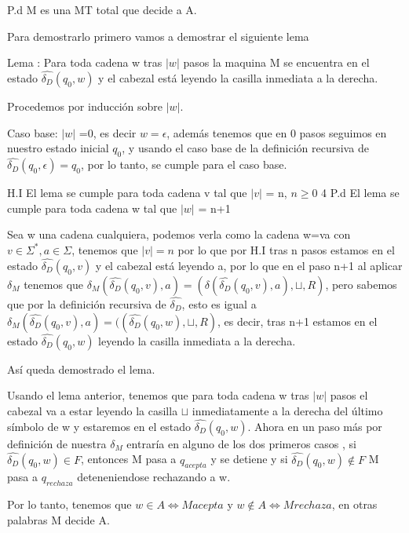 \documentclass{article}
\begin{document}
\begin{enumerate}
  P.d M es una MT total que decide a A.

  Para demostrarlo primero vamos a demostrar el siguiente lema

  Lema : Para toda cadena w tras $|w|$ pasos la maquina M se encuentra en el estado $\widehat{\delta_D}(q_0,w)$ y el cabezal está leyendo la casilla inmediata a la derecha.

  Procedemos por inducción sobre $|w|$.

  Caso base: $|w|$ =0, es decir $w=\epsilon$, además tenemos que en 0 pasos seguimos en nuestro estado inicial $q_0$, y usando el caso base de la definición recursiva de $\widehat{\delta_D}(q_0,\epsilon)=q_0$, por lo tanto, se cumple para el caso base.

  H.I El lema se cumple para toda cadena v tal que $|v|$ = n, $n \geq 0$
4
  P.d El lema se cumple para toda cadena w tal que $|w|$ = n+1

  Sea w una cadena cualquiera, podemos verla como la cadena w=va con $v \in \Sigma^*, a \in \Sigma$, tenemos que $|v| = n$ por lo que por H.I tras n pasos estamos en el estado $\widehat{\delta_D}(q_0,v)$ y el cabezal está leyendo a, por lo que en el paso n+1 al aplicar $\delta_M$ tenemos que $\delta_M(\widehat{\delta_D}(q_0,v),a)= (\delta(\widehat{\delta_D}(q_0,v),a),\sqcup,R)$, pero sabemos que por la definición recursiva de $\widehat{\delta_D}$, esto es igual a $\delta_M(\widehat{\delta_D}(q_0,v),a)= ((\widehat{\delta_D}(q_0,w),\sqcup,R)$, es decir, tras n+1 estamos en el estado $\widehat{\delta_D}(q_0,w)$ leyendo la casilla inmediata a la derecha.

  Así queda demostrado el lema.


  Usando el lema anterior, tenemos que para toda cadena w tras $|w|$ pasos el cabezal va a estar leyendo la casilla $\sqcup$ inmediatamente a la derecha del último símbolo de w y estaremos en el estado $\widehat{\delta_D}(q_0,w)$. Ahora en un paso más por definición de nuestra $\delta_M$ entraría en alguno de los dos primeros casos , si $\widehat{\delta_D}(q_0,w) \in F$, entonces M pasa a $q_{acepta}$ y se detiene y si $\widehat{\delta_D}(q_0,w) \notin F$ M pasa a $q_{rechaza}$ deteneniendose rechazando a w. 

  Por lo tanto, tenemos que $w \in A \Leftrightarrow M acepta $ y $w \notin A \Leftrightarrow M rechaza $, en otras palabras M decide A.
  

  
  \end{enumerate}
\end{document}
